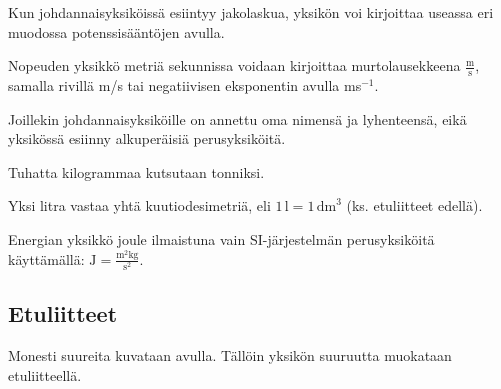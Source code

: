 Kun johdannaisyksiköissä esiintyy jakolaskua, yksikön voi kirjoittaa useassa eri muodossa potenssisääntöjen avulla.

\begin{esimerkki}

Nopeuden yksikkö metriä sekunnissa voidaan kirjoittaa murtolausekkeena $\frac{\text{m}}{\text{s}}$, samalla rivillä m/s tai negatiivisen eksponentin avulla ms$^{-1}$.

\end{esimerkki}

Joillekin johdannaisyksiköille on annettu oma nimensä ja lyhenteensä, eikä yksikössä esiinny alkuperäisiä perusyksiköitä. 

\begin{esimerkki}

Tuhatta kilogrammaa kutsutaan tonniksi.

Yksi litra vastaa yhtä kuutiodesimetriä, eli $1\,\text{l}=1\,\text{dm}^3$ (ks. etuliitteet edellä).

Energian yksikkö joule ilmaistuna vain SI-järjestelmän perusyksiköitä käyttämällä: $\text{J}=\frac{\text{m}^2\text{kg}}{\text{s}^2}$.

\end{esimerkki}

\subsection*{Etuliitteet}

Monesti suureita kuvataan  avulla. Tällöin yksikön suuruutta muokataan etuliitteellä.

